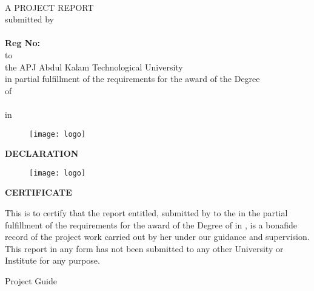 \documentclass[12pt,a4paper]{report}
\begin{document}
\thispagestyle{empty}
\begin{center}
{\Large{\textbf{\projectnameb{}}}}
\vspace{5mm}
\\A PROJECT REPORT
\vspace{5mm}
\\submitted by
\vspace{5mm}
\\ \dept{} 
\\{\textbf{Reg No:\roll{}}}
\vspace{5mm}
\\to
\\the APJ Abdul Kalam Technological University
\\in partial fulfillment of the requirements for the award of the Degree
\\of
\\ \degree{}
\\in
\\ \stream{}
\end{center}

\begin{figure}[ht]
\centering
\texttt{[image: logo]}
\end{figure}

\begin{center}
{\dept{}
\vspace{5mm}
\insti{}}
\end{center}

\newpage
\thispagestyle{empty}

\begin{center}
\textbf{DECLARATION}
\end{center}


\newpage
\thispagestyle{empty}
\begin{center}
{\insti{}}

\begin{figure}[ht]
\centering
\texttt{[image: logo]}
\end{figure}
{\large{\textbf{CERTIFICATE}}}

\end{center}

This is to certify that the report entitled,\textbf{ \projectname{}} submitted by \textbf{\stud{}} to the \uni{} in the partial fulfillment of the requirements for the award of the Degree of \degree{} in \stream{}, \depts{} is a bonafide record of the project work carried out by her under our guidance and supervision. This report in any form has not been submitted to any other University or Institute for any purpose.
\vspace{25mm}
 \\         
\begin{flushright} Project Guide \end{flushright} 
                                                                                     
\end{document}
